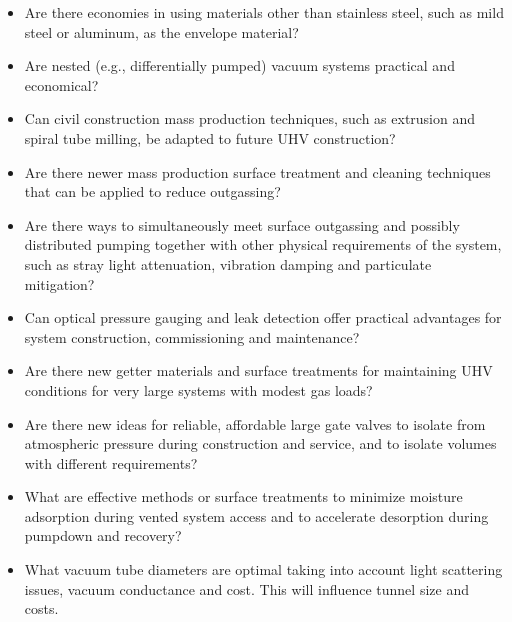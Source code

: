 \begin{itemize}
\item  Are there economies in using materials other than stainless steel, such as mild steel or aluminum, as the envelope material? %
\item Are nested (e.g., differentially pumped) vacuum systems practical and economical? 

\item Can civil construction mass production techniques, such as extrusion and spiral tube milling, be adapted to future UHV construction?

\item Are there newer mass production surface treatment and cleaning techniques that can be applied to reduce outgassing? %

\item Are there ways to simultaneously meet surface outgassing and possibly distributed pumping together with other physical requirements of the system, such as 
stray light attenuation, vibration damping and particulate mitigation?

\item Can optical pressure gauging and leak detection offer practical advantages for system construction, commissioning and maintenance?

\item Are there new getter materials and surface treatments for maintaining UHV conditions for very large systems with modest gas loads?

\item Are there new ideas for reliable, affordable large gate valves to isolate from atmospheric pressure during construction and service, and to isolate volumes with different requirements?

\item What are effective methods or surface treatments to minimize moisture adsorption during vented system access and to accelerate desorption during pumpdown and recovery?

\item What vacuum tube diameters are optimal taking into account light scattering issues, vacuum conductance and cost. This will influence tunnel size and costs.

\end{itemize}

